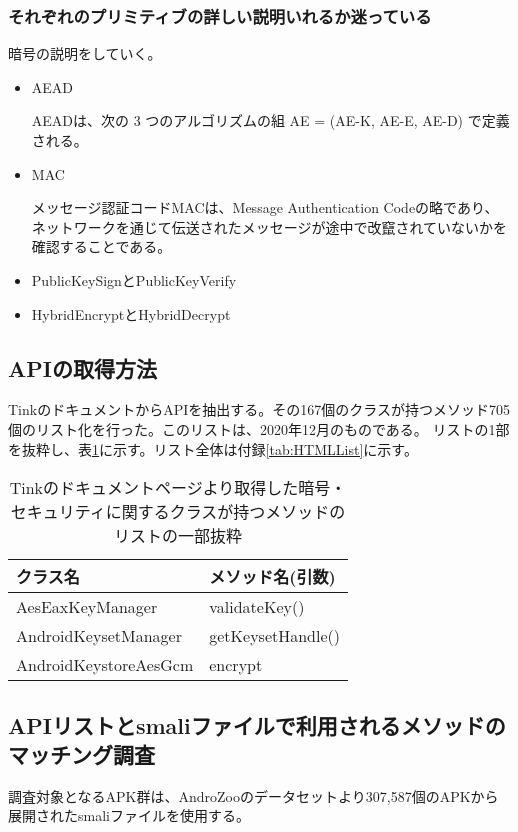 \subsubsection{それぞれのプリミティブの詳しい説明いれるか迷っている}
暗号の説明をしていく。
\begin{itemize}
\item AEAD

AEADは、次の 3 つのアルゴリズムの組 AE = (AE-K, AE-E, AE-D) で定義される。

\item MAC

メッセージ認証コードMACは、Message Authentication Codeの略であり、ネットワークを通じて伝送されたメッセージが途中で改竄されていないかを確認することである。

\item PublicKeySignとPublicKeyVerify

\item HybridEncryptとHybridDecrypt

\end{itemize}
\fi
\subsection{APIの取得方法}
\label{sec:APIの取得方法}
Tinkのドキュメント\cite{Tink Cryptography}からAPIを抽出する。その167個のクラスが持つメソッド705個のリスト化を行った。このリストは、2020年12月のものである。
リストの1部を抜粋し、表\ref{tb:APImethod}に示す。リスト全体は付録\ref{tab:HTMLList}に示す。

\begin{table}[t]
\begin{center}
\caption{Tinkのドキュメントページより取得した暗号・セキュリティに関するクラスが持つメソッドのリストの一部抜粋}
\begin{tabular}{ll} \hline
クラス名 & メソッド名(引数) \\ \hline
AesEaxKeyManager & validateKey() \\
AndroidKeysetManager & getKeysetHandle() \\
AndroidKeystoreAesGcm &  encrypt\\ \hline
\end{tabular}
\label{tb:APImethod}
\end{center}
\end{table}

\newpage

\subsection{APIリストとsmaliファイルで利用されるメソッドのマッチング調査}
\label{sec:調査}
調査対象となるAPK群は、AndroZoo\cite{AndroZoo}のデータセットより307,587個のAPKから展開されたsmaliファイルを使用する。

